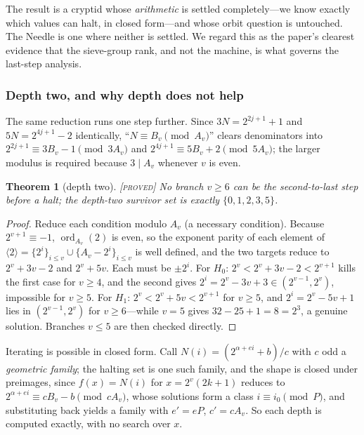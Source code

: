 \documentclass[11pt]{article}
\newtheorem{theorem}{Theorem}[section]
\theoremstyle{definition}
\theoremstyle{remark}
\newcommand{\ord}{\operatorname{ord}}
\newcommand{\Proved}{\textsc{[proved]}}
\begin{document}
The result is a cryptid whose \emph{arithmetic} is settled completely---we
know exactly which values can halt, in closed form---and whose orbit question
is untouched.  The Needle is one where neither is settled.  We regard this as
the paper's clearest evidence that the sieve-group rank, and not the machine,
is what governs the last-step analysis.

\subsubsection*{Depth two, and why depth does not help}

The same reduction runs one step further.  Since $3N=2^{2j+1}+1$ and
$5N=2^{4j+1}-2$ identically, ``$N\equiv B_v \pmod{A_v}$'' clears denominators
into $2^{2j+1}\equiv 3B_v-1 \pmod{3A_v}$ and $2^{4j+1}\equiv 5B_v+2
\pmod{5A_v}$; the larger modulus is required because $3\mid A_v$ whenever $v$
is even.

\begin{theorem}[depth two]\label{thm:sheep-d2}
\Proved\; No branch $v\ge6$ can be the second-to-last step before a halt; the
depth-two survivor set is exactly $\{0,1,2,3,5\}$.
\end{theorem}

\begin{proof}
Reduce each condition modulo $A_v$ (a necessary condition).  Because
$2^{v+1}\equiv-1$, $\ord_{A_v}(2)$ is even, so the exponent parity of each
element of $\langle2\rangle=\{2^i\}_{i\le v}\cup\{A_v-2^i\}_{i\le v}$ is well
defined, and the two targets reduce to $2^v+3v-2$ and $2^v+5v$.  Each must be
$\pm2^i$.  For $H_0$: $2^v<2^v+3v-2<2^{v+1}$ kills the first case for
$v\ge4$, and the second gives $2^i=2^v-3v+3\in(2^{v-1},2^v)$, impossible for
$v\ge5$.  For $H_1$: $2^v<2^v+5v<2^{v+1}$ for $v\ge5$, and $2^i=2^v-5v+1$ lies
in $(2^{v-1},2^v)$ for $v\ge6$---while $v=5$ gives $32-25+1=8=2^3$, a genuine
solution.  Branches $v\le5$ are then checked directly.
\end{proof}

Iterating is possible in closed form.  Call $N(i)=(2^{\alpha+ei}+b)/c$ with
$c$ odd a \emph{geometric family}; the halting set is one such family, and the
shape is closed under preimages, since $f(x)=N(i)$ for $x=2^v(2k+1)$ reduces
to $2^{\alpha+ei}\equiv cB_v-b \pmod{cA_v}$, whose solutions form a class
$i\equiv i_0 \pmod P$, and substituting back yields a family with $e'=eP$,
$c'=cA_v$.  So each depth is computed exactly, with no search over $x$.
\end{document}
